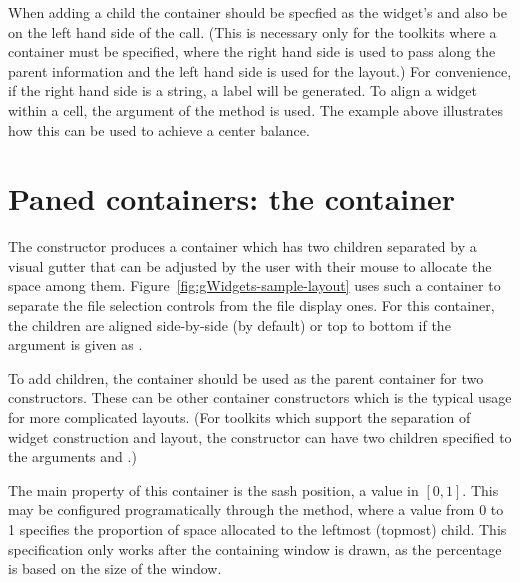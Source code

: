 When adding a child the  container should be specfied as
the widget's  and also be on the left hand side of the
\code{[\ASSIGN} call. (This is necessary only for the toolkits where a
container must be specified, where the right hand side is used to pass
along the parent information and the left hand side is used for the
layout.) For convenience, if the right hand side is a string, a label
will be generated.  To align a widget within a cell, the
 argument of the \code{[\ASSIGN}{glayout} method
is used. The example above illustrates how this can be used to achieve
a center balance.





\section{Paned containers: the  container}
\label{sec:gWidgets-gpanedgroup-container}

The  constructor produces a container which
has two children separated by a visual gutter that can be
adjusted by the user with their mouse to allocate the space among them.
Figure~\ref{fig:gWidgets-sample-layout} uses such a
container to separate the file selection controls from the file
display ones.  For this container, the children are aligned
side-by-side (by default) or top to bottom if the
 argument is given as
. 


To add children, the container should be used as the parent container
for two constructors. These can be other container constructors which
is the typical usage for more complicated layouts.
(For toolkits which support the separation of widget
construction and layout, the  constructor can
have two children specified to the arguments
 and .)

The main property of this container is the sash position, a value in
$[0,1]$. This may be configured programatically
through the  method, where a value
from 0 to 1 specifies the proportion of space allocated to the
leftmost (topmost) child. This specification only works after the
containing window is drawn, as the percentage is based on the size of
the window.


